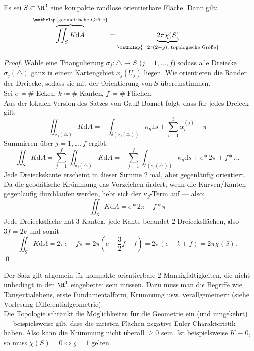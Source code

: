 \begin{theorem}
  Es sei \( S \subset \R^3 \) eine kompakte randlose orientierbare Fläche. Dann gilt:
  \begin{equation*}
    \overbrace{\iint_SK\text{d}A}^{\mathclap{\text{geometrische Größe}}} = \underbrace{2\pi\chi(S)}_{\mathclap{=2\pi(2-g)\text{, topologische Größe}}}\text{.}
  \end{equation*}
  \begin{proof}
    Wähle eine Triangulierung \( \sigma_j: \triangle \to S \) (\( j = 1,\dots,f \)) sodass alle Dreiecke \( \sigma_j(\triangle) \) ganz in einem Kartengebiet \( x_j(U_j) \) liegen. Wie orientieren die Ränder der Dreiecke, sodass sie mit der Orientierung von \( S \) übereinstimmen. \\
    Sei \( e \coloneqq \# \) Ecken, \( k \coloneqq \# \) Kanten, \( f \coloneqq \# \) Flächen. \\
    Aus der lokalen Version des Satzes von Gauß-Bonnet folgt, dass für jedes Dreieck gilt:
    \begin{equation*}
      \iint_{\sigma_j(\triangle)}K\text{d}A = -\int_{\delta(\sigma_j(\triangle))}\kappa_g\text{d}s + \sum_{i = 1}^3 \alpha_i^{(j)} - \pi
    \end{equation*}
    Summieren über \( j = 1,\dots,f \) ergibt:
    \begin{equation*}
      \iint_S K\text{d}A = \sum_{j=1}^f\iint_{\sigma_j(\triangle)}K\text{d}A = -\sum_{j=1}^f\int_{\delta(\sigma_j(\triangle))}\kappa_g\text{d}s + e*2\pi + f*\pi \text{.}
    \end{equation*}
    Jede Dreieckskante erscheint in dieser Summe \( 2 \) mal, aber gegenläufig orientiert. Da die geodätische Krümmung das Vorzeichen ändert, wenn die Kurven/Kanten gegenläufig durchlaufen werden, hebt sich der \( \kappa_g \)-Term auf --- also:
    \begin{equation*}
      \iint_SK\text{d}A = e*2\pi + f*\pi
    \end{equation*}
    Jede Dreiecksfläche hat \( 3 \) Kanten, jede Kante berandet \( 2 \) Dreiecksflächen, also \( 3f = 2k \) und somit
    \begin{equation*}
      \iint_SK\text{d}A = 2\pi e - f\pi = 2\pi(e - \frac{3}{2}f + f) = 2\pi(e-k+f) = 2\pi\chi(S)\text{.}
    \end{equation*} \qed
  \end{proof}
\end{theorem}

\begin{remark}
  Der Satz gilt allgemein für kompakte orientierbare \( 2 \)-Mannigfaltigkeiten, die nicht unbedingt in den \( \R^3 \) eingebettet sein müssen. Dazu muss man die Begriffe wie Tangentialebene, erste Fundamentalform, Krümmung usw. verallgemeinern (siehe Vorlesung Differentialgeometrie). \\
  Die Topologie schränkt die Möglichkeiten für die Geometrie ein (und umgekehrt) --- beispielsweise gilt, dass die meisten Flächen negative Euler-Charakteristik haben. Also kann die Krümmung nicht überall \( \geq 0 \) sein. Ist beispielsweise \( K \equiv 0 \), so muss \( \chi(S) = 0 \Leftrightarrow g = 1 \) gelten.
\end{remark}